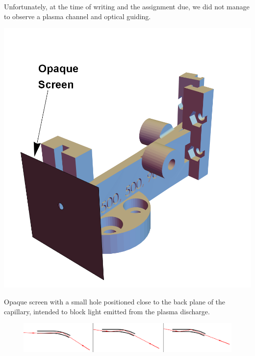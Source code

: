 \documentclass[../main.tex]{subfiles}
\begin{document}
Unfortunately, at the time of writing and the assignment due, we did not manage to observe a plasma channel and optical guiding.
\begin{marginfigure}
\includegraphics[width=\marginparwidth]{figures/cad/opaquescreen.png}
\caption{Opaque screen with a small hole positioned close to the back plane of the capillary, intended to block light emitted from the plasma discharge.}
\label{fig:opaque}
\end{marginfigure}
\begin{figure}
    \centering
    \includegraphics[width=\textwidth]{figures/Curved capillaries/inner-refractions.pdf}
    \caption{}
    \label{fig:my_label}
\end{figure}
\end{document}

